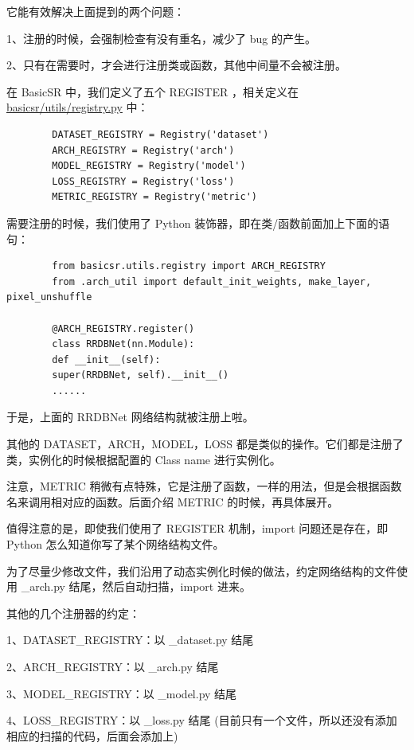 \documentclass[../main.tex]{subfiles}
\begin{document}
	它能有效解决上面提到的两个问题：
	
	1、注册的时候，会强制检查有没有重名，减少了 bug 的产生。
	
	2、只有在需要时，才会进行注册类或函数，其他中间量不会被注册。
	
	在 BasicSR 中，我们定义了五个 REGISTER ，相关定义在 \href{https://github.com/XPixelGroup/BasicSR/blob/master/basicsr/utils/registry.py}{basicsr/utils/registry.py} 中：
	\begin{verbatim}
		DATASET_REGISTRY = Registry('dataset')
		ARCH_REGISTRY = Registry('arch')
		MODEL_REGISTRY = Registry('model')
		LOSS_REGISTRY = Registry('loss')
		METRIC_REGISTRY = Registry('metric')
	\end{verbatim}
	
	需要注册的时候，我们使用了 Python 装饰器，即在类/函数前面加上下面的语句：
	\begin{verbatim}
		from basicsr.utils.registry import ARCH_REGISTRY
		from .arch_util import default_init_weights, make_layer, pixel_unshuffle
		
		@ARCH_REGISTRY.register()
		class RRDBNet(nn.Module):
		def __init__(self):
		super(RRDBNet, self).__init__()
		......
	\end{verbatim}
	
	于是，上面的 RRDBNet 网络结构就被注册上啦。
	
	其他的 DATASET，ARCH，MODEL，LOSS 都是类似的操作。它们都是注册了类，实例化的时候根据配置的 Class name 进行实例化。
	
	注意，METRIC 稍微有点特殊，它是注册了函数，一样的用法，但是会根据函数名来调用相对应的函数。后面介绍 METRIC 的时候，再具体展开。
	
	值得注意的是，即使我们使用了 REGISTER 机制，import 问题还是存在，即 Python 怎么知道你写了某个网络结构文件。
	
	为了尽量少修改文件，我们沿用了动态实例化时候的做法，约定网络结构的文件使用  \_arch.py 结尾，然后自动扫描，import 进来。
	
	其他的几个注册器的约定：
	
	1、DATASET\_REGISTRY：以 \_dataset.py 结尾
	
	2、ARCH\_REGISTRY：以 \_arch.py 结尾
	
	3、MODEL\_REGISTRY：以 \_model.py 结尾
	
	4、LOSS\_REGISTRY：以 \_loss.py 结尾 (目前只有一个文件，所以还没有添加相应的扫描的代码，后面会添加上)
	
\end{document}
